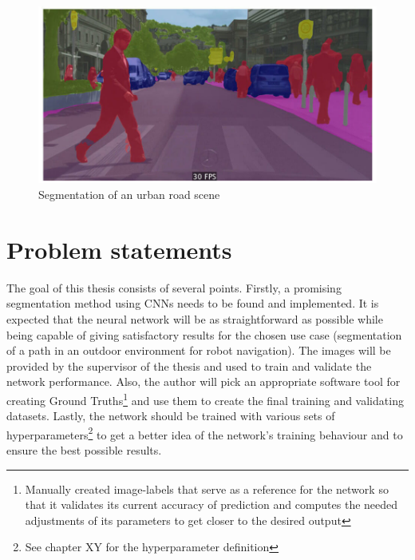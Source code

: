 \vspace{5mm}
\begin{figure}[htb]
	\begin{center}
		\includegraphics*[width=13cm, keepaspectratio]{obr/semseg.jpg}
	\end{center}
	\caption{Segmentation of an urban road scene} %
	\label{cocka}
\end{figure}

\chapter{Problem statements}
The goal of this thesis consists of several points. Firstly, a promising segmentation method using CNNs needs to be found and implemented. It is expected that the neural network will be as straightforward as possible while being capable of giving satisfactory results for the chosen use case (segmentation of a path in an outdoor environment for robot navigation). The images will be provided by the supervisor of the thesis and used to train and validate the network performance. Also, the author will pick an appropriate software tool for creating Ground Truths\footnote{Manually created image-labels that serve as a reference for the network so that it validates its current accuracy of prediction and computes the needed adjustments of its parameters to get closer to the desired output} and use them to create the final training and validating datasets. Lastly, the network should be trained with various sets of hyperparameters\footnote{See chapter XY for the hyperparameter definition} to get a better idea of the network's training behaviour and to ensure the best possible results. 


